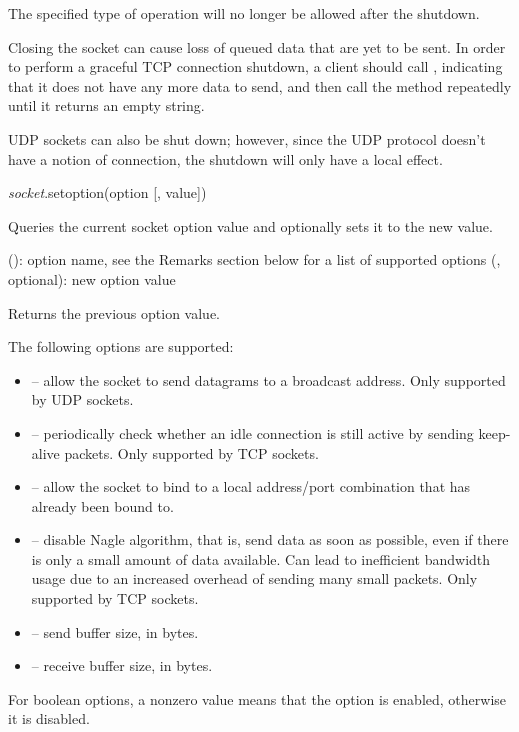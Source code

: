 \documentclass[a4paper,12pt,twoside,extrafontsizes]{memoir}
\begin{document}
\begin{funcremarks}
	The specified type of operation will no longer be allowed after the shutdown.
	
	Closing the socket can cause loss of queued data that are yet to be sent. In order to perform a graceful TCP connection shutdown, a client should call , indicating that it does not have any more data to send, and then call the  method repeatedly until it returns an empty string.
	
	UDP sockets can also be shut down; however, since the UDP protocol doesn't have a notion of connection, the shutdown will only have a local effect.
\end{funcremarks}


\begin{luafuncprototype}
	\emph{socket}.setoption(option [, value])
\end{luafuncprototype}

\begin{funcdescr}
	Queries the current socket option value and optionally sets it to the new value.
\end{funcdescr}

\begin{funcparams}
	 (): option name, see the Remarks section below for a list of supported options
	 (, optional): new option value
\end{funcparams}

\begin{funcret}
	Returns the previous option value.
\end{funcret}

\begin{funcremarks}
	The following options are supported:
	\begin{itemize}
		\item {} -- allow the socket to send datagrams to a broadcast address. Only supported by UDP sockets.
		\item {} -- periodically check whether an idle connection is still active by sending keep-alive packets. Only supported by TCP sockets.
		\item {} -- allow the socket to bind to a local address/port combination that has already been bound to.
		\item {} -- disable Nagle algorithm, that is, send data as soon as possible, even if there is only a small amount of data available. Can lead to inefficient bandwidth usage due to an increased overhead of sending many small packets. Only supported by TCP sockets.
		\item {} -- send buffer size, in bytes.
		\item {} -- receive buffer size, in bytes.
	\end{itemize}
	For boolean options, a nonzero value means that the option is enabled, otherwise it is disabled.
\end{funcremarks}
\end{document}
